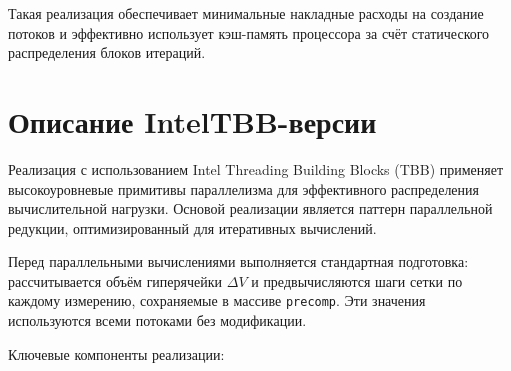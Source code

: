 \documentclass[12pt,a4paper]{extarticle}
\begin{document}
Такая реализация обеспечивает минимальные накладные расходы на создание потоков и эффективно использует кэш-память процессора за счёт статического распределения блоков итераций.

\newpage
\section{Описание IntelTBB-версии}

Реализация с использованием Intel Threading Building Blocks (TBB) применяет высокоуровневые примитивы параллелизма для эффективного распределения вычислительной нагрузки. Основой реализации является паттерн параллельной редукции, оптимизированный для итеративных вычислений.

Перед параллельными вычислениями выполняется стандартная подготовка: рассчитывается объём гиперячейки $\Delta V$ и предвычисляются шаги сетки по каждому измерению, сохраняемые в массиве \texttt{precomp}. Эти значения используются всеми потоками без модификации.

Ключевые компоненты реализации:
\end{document}
